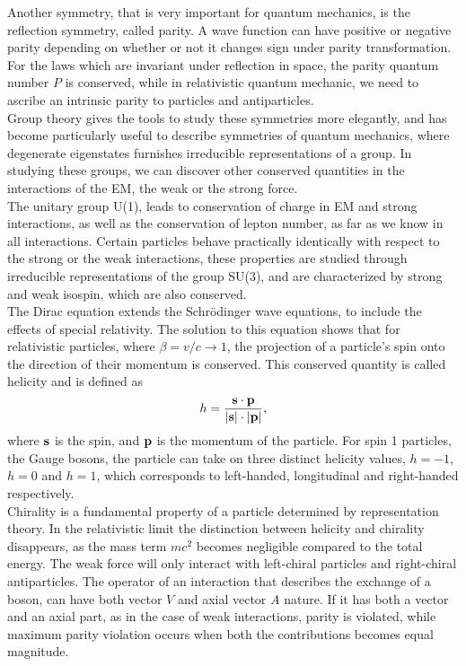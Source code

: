 \documentclass[12pt,a4paper]{article}
\numberwithin{equation}{section}
\begin{document}
Another symmetry, that is very important for quantum mechanics, is the
reflection symmetry, called parity. A wave function can have positive or
negative parity depending on whether or not it changes sign under parity
transformation. For the laws which are invariant under reflection in space, the
parity quantum number $P$ is conserved, while in relativistic quantum mechanic,
we need to ascribe an intrinsic parity to particles and antiparticles.\\

Group theory gives the tools to study these symmetries more elegantly, and has
become particularly useful to describe symmetries of quantum mechanics, where
degenerate eigenstates furnishes irreducible representations of a group. In
studying these groups, we can discover other conserved quantities in the
interactions of the EM, the weak or the strong force.\\

The unitary group U(1), leads to conservation of charge in EM and strong
interactions, as well as the conservation of lepton number, as far as
we know in all interactions. Certain particles behave practically identically
with respect to the strong or the weak interactions, these properties are
studied through irreducible representations of the group SU(3), and are
characterized by strong and weak isospin, which are also conserved.\\

The Dirac equation extends the Schrödinger wave equations, to include the
effects of special relativity. The solution to this equation shows that for
relativistic particles, where $\beta = v/c \rightarrow 1$, the projection of a particle's spin
onto the direction of their momentum is conserved. This conserved quantity is
called helicity\cite[63]{Povh2015} and is defined as
\begin{equation}
  h = \frac{\vb{s \cdot p}}{\abs{\vb s} \cdot \abs{\vb p}},
\end{equation}
where $\vb s$ is the spin, and $\vb p$ is the momentum of the particle. For
spin 1 particles, the Gauge bosons, the particle can take on three distinct
helicity values, $h=-1$, $h=0$ and $h=1$, which corresponds to left-handed,
longitudinal and right-handed respectively.\\

Chirality is a fundamental property of a particle determined by representation
theory. In the relativistic limit the distinction between helicity and chirality
disappears, as the mass term $mc^2$ becomes negligible compared to the total
energy. The weak force will only interact with left-chiral particles and
right-chiral antiparticles. The operator of an interaction that describes the
exchange of a boson, can have both vector $V$ and axial vector $A$ nature. If it
has both a vector and an axial part, as in the case of weak interactions, parity
is violated, while maximum parity violation occurs when both the contributions
becomes equal magnitude.\\
\end{document}
